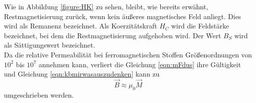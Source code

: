 Wie in Abbildung \ref{figure:HK} zu sehen, bleibt, wie bereits erwähnt, Restmagnetisierung zurück, wenn kein äußeres magnetisches
Feld anliegt. Dies wird als Remanenz bezeichnet.
Als Koerzitätskraft $H_C$ wird die Feldstärke bezeichnet, bei dem die Restmagnetisierung aufgehoben wird.
Der Wert $B_S$ wird als Sättigungswert bezeichnet.
\\
Da die relative Permeabilität bei ferromagnetischen Stoffen Größenordnungen von $10^2$ bis $10^7$ annehmen kann, verliert die
Gleichung \eqref{eqn:mFdus} ihre Gültigkeit und Gleichung \eqref{eqn:kbmirwasauszudenken} kann zu
\begin{equation}
  \vec{B} \approx \mu_0 \vec{M}
\end{equation}
umgeschrieben werden.
